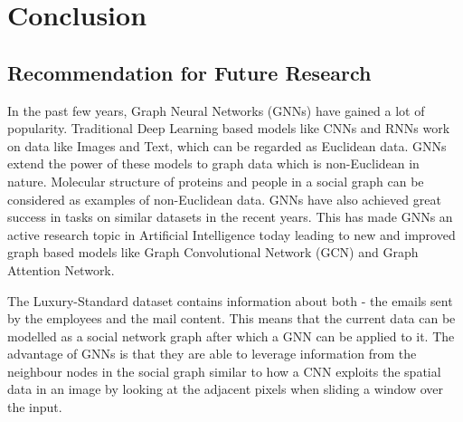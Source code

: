 
\chapter{Conclusion} %

\label{Chapter6} %



\section{Recommendation for Future Research}

In the past few years, Graph Neural Networks (GNNs) have gained a lot of popularity. Traditional Deep Learning based models like CNNs and RNNs work on data like Images and Text, which can be regarded as Euclidean data. GNNs extend the power of these models to graph data which is non-Euclidean in nature. Molecular structure of proteins and people in a social graph can be considered as examples of non-Euclidean data. GNNs have also achieved great success in tasks on similar datasets in the recent years\cite{Wu2020GraphCN,fout2017protein}. This has made GNNs an active research topic in Artificial Intelligence today leading to new and improved graph based models like Graph Convolutional Network (GCN)\cite{kipf2017semi} and Graph Attention Network\cite{velickovic2018graph}.


The Luxury-Standard dataset contains information about both - the emails sent by the employees and the mail content. This means that the current data can be modelled as a social network graph after which a GNN can be applied to it. The advantage of GNNs is that they are able to leverage information from the neighbour nodes in the social graph similar to how a CNN exploits the spatial data in an image by looking at the adjacent pixels when sliding a window over the input. 


